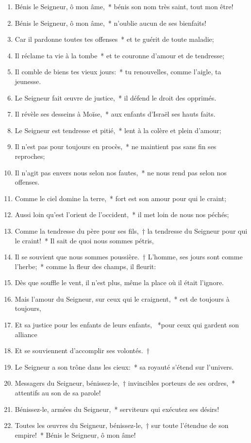 \documentclass[twoside]{article}
\begin{document}
\begin{paracol}[1]{2}
\begin{enumerate}[wide, itemsep=0mm, labelwidth=!, labelindent=0pt, label=\color{gregoriocolor}\theenumi]
\item Bénis le Seigneur, ô mon âme,~* bénis son nom très saint, tout mon être!
\item Bénis le Seigneur, ô mon âme,~* n'oublie aucun de ses bienfaits!
\item Car il pardonne toutes tes offenses~* et te guérit de toute maladie;
\item Il réclame ta vie à la tombe~* et te couronne d'amour et de tendresse;
\item Il comble de biens tes vieux jours:~* tu renouvelles, comme l'aigle, ta jeunesse.
\item Le Seigneur fait œuvre de justice,~* il défend le droit des opprimés.
\item Il révèle ses desseins à Moïse,~* aux enfants d'Israël ses hauts faits.
\item Le Seigneur est tendresse et pitié,~* lent à la colère et plein d'amour;
\item Il n'est pas pour toujours en procès,~* ne maintient pas sans fin ses reproches;
\item Il n'agit pas envers nous selon nos fautes,~* ne nous rend pas selon nos offenses.
\item Comme le ciel domine la terre,~* fort est son amour pour qui le craint;
\item Aussi loin qu'est l'orient de l'occident,~* il met loin de nous nos péchés;
\item Comme la tendresse du père pour ses fils,~† la tendresse du Seigneur pour qui le craint!~* Il sait de quoi nous sommes pétris,
\item Il se souvient que nous sommes poussière.~† L'homme, ses jours sont comme l'herbe;~* comme la fleur des champs, il fleurit:
\item Dès que souffle le vent, il n'est plus, même la place où il était l'ignore.
\item Mais l'amour du Seigneur, sur ceux qui le craignent,~* est de toujours à toujours,
\item Et sa justice pour les enfants de leurs enfants, ~*pour ceux qui gardent son alliance
\item Et se souviennent d'accomplir ses volontés.~†
\item Le Seigneur a son trône dans les cieux:~* sa royauté s'étend sur l'univers.
\item Messagers du Seigneur, bénissez-le,~† invincibles porteurs de ses ordres,~* attentifs au son de sa parole!
\item Bénissez-le, armées du Seigneur,~* serviteurs qui exécutez ses désirs!
\item Toutes les œuvres du Seigneur, bénissez-le,~† sur toute l'étendue de son empire!~* Bénis le Seigneur, ô mon âme!
\end{enumerate}
\vspace{5.5cm}
\switchcolumn*


\end{paracol}
\end{document}
